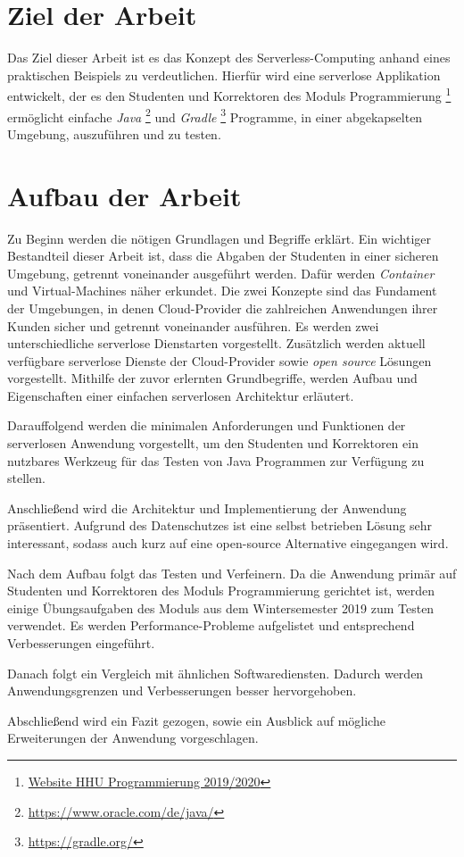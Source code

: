 \section{Ziel der Arbeit}
Das Ziel dieser Arbeit ist es das Konzept des Serverless-Computing anhand eines praktischen
Beispiels zu verdeutlichen. Hierfür wird eine serverlose Applikation entwickelt,
der es den Studenten und Korrektoren des Moduls Programmierung
\footnote{
  \href{
    https://www.cs.hhu.de/de/lehrstuehle-und-arbeitsgruppen/betriebssysteme-prof-dr-michael-schoettner/lehre-und-abschlussarbeiten/fruehere-lehrveranstaltungen/vorlesungen/ws-201920/programmierung.html?C=D\%253BO\%253DA
    }{Website HHU Programmierung 2019/2020}
} ermöglicht einfache
\textit{Java} \footnote{\url{https://www.oracle.com/de/java/}} und
\textit{Gradle} \footnote{\url{https://gradle.org/}} Programme, in einer abgekapselten Umgebung, auszuführen und zu testen.


\section{Aufbau der Arbeit}
Zu Beginn werden die nötigen Grundlagen und Begriffe erklärt.
Ein wichtiger Bestandteil dieser Arbeit ist, dass die Abgaben der Studenten in einer sicheren Umgebung,
getrennt voneinander ausgeführt werden. Dafür werden \textit{Container} \cite{Docker} und Virtual-Machines 
näher erkundet. Die zwei Konzepte sind das Fundament der Umgebungen, in denen Cloud-Provider die zahlreichen 
Anwendungen ihrer Kunden sicher und getrennt voneinander ausführen.
Es werden zwei unterschiedliche serverlose Dienstarten vorgestellt. 
Zusätzlich werden aktuell verfügbare serverlose Dienste der Cloud-Provider sowie \textit{open source} 
Lösungen vorgestellt. Mithilfe der zuvor erlernten Grundbegriffe, werden Aufbau und 
Eigenschaften einer einfachen serverlosen Architektur erläutert.

Darauffolgend werden die minimalen Anforderungen und Funktionen der serverlosen Anwendung vorgestellt, um den Studenten und Korrektoren ein nutzbares Werkzeug für das Testen von Java Programmen zur Verfügung zu stellen.

Anschließend wird die Architektur und Implementierung der Anwendung präsentiert. Aufgrund des Datenschutzes ist eine selbst betrieben Lösung sehr interessant, sodass auch kurz auf eine open-source Alternative eingegangen wird.

Nach dem Aufbau folgt das Testen und Verfeinern. Da die Anwendung primär auf Studenten und Korrektoren des Moduls Programmierung gerichtet ist, werden einige Übungsaufgaben des Moduls aus dem Wintersemester 2019 zum Testen verwendet. Es werden Performance-Probleme aufgelistet und entsprechend Verbesserungen eingeführt.

Danach folgt ein Vergleich mit ähnlichen Softwarediensten. Dadurch werden Anwendungsgrenzen und Verbesserungen besser hervorgehoben.

Abschließend wird ein Fazit gezogen, sowie ein Ausblick auf mögliche Erweiterungen der Anwendung vorgeschlagen.
